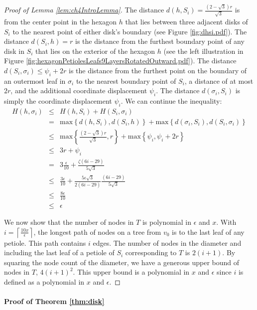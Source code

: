 \documentclass[10pt]{CSUNthesis}
\theoremstyle{plain}%
\theoremstyle{definition}
\theoremstyle{remark}
\newcommand{\ceil}[1]{\left\lceil #1 \right\rceil}
\newcommand{\lr}[1]{\left( #1 \right)}
\begin{document}
\begin{proof}[Proof of Lemma \ref{lem:ch4IntroLemma}]
The distance $d\lr{h,S_i} = \frac{\lr{2-\sqrt{3}}r}{\sqrt{3}}$ is from the center point in the hexagon $h$ that lies between three adjacent disks of $S_i$ to the nearest point of either disk's boundary (see Figure \ref{fig:dhsi.pdf}).  
The distance $d\lr{S_i,h} = r$ is the distance from the furthest boundary point of any disk in $S_i$ that lies on the exterior of the hexagon $h$ (see the left illustration in Figure \ref{fig:hexagonPetiolesLeafs9LayersRotatedOutward.pdf}).  
The distance $d\lr{S_i,\sigma_i} \leq \psi_i + 2r$  is the distance from the furthest point on the boundary of an outermost leaf in $\sigma_i$ to the nearest boundary point of $S_i$, a distance of at most $2r$, and the additional coordinate displacement $\psi_i$.  
The distance $d\lr{\sigma_i,S_i}$ is simply the coordinate displacement $\psi_i$.  
We can continue the inequality:
$$\begin{array}{rcl}
H(h,\sigma_i) &\leq&H(h, S_i) + H(S_i, \sigma_i)\\
&=&\text{max} \left\lbrace d\lr{h,S_i}, d\lr{S_i,h} \right\rbrace + \text{max} \left\lbrace d\lr{\sigma_i,S_i}, d\lr{S_i,\sigma_i} \right\rbrace\\
&\leq& \text{max} \left\lbrace \frac{\lr{2-\sqrt{3}}r}{\sqrt{3}}, r \right\rbrace + \text{max} \left\lbrace \psi_i, \psi_i + 2r\right\rbrace\\
&\leq& 3r + \psi_i \\
&=& 3 \frac{\epsilon}{10} + \frac{\zeta(6i-29)}{5 \sqrt{3}}\\
&\leq&\frac{3\epsilon}{10} + \frac{5\epsilon  \sqrt{3}}{2(6i-29)}\frac{\lr{6i-29}}{5 \sqrt{3}}\\
&\leq&\frac{8\epsilon}{10}\\
&\leq&\epsilon
\end{array}
$$

We now show that the number of nodes in $T$ is polynomial in $\epsilon$ and $x$.  
With $i = \ceil{\frac{10x}{\epsilon}}$, the longest path of nodes on a tree from $v_0$ is to the last leaf of any petiole.  This path contains $i$ edges.  The number of nodes in the diameter and including the last leaf of a petiole of $S_i$ corresponding to $T$ is $2(i+1)$.  By squaring the node count of the diameter, we have a generous upper bound of nodes in $T$, $4(i+1)^2$.  This upper bound is a polynomial in $x$ and $\epsilon$ since $i$ is defined as a polynomial in $x$ and $\epsilon$.

\end{proof}

\paragraph{Proof of Theorem \ref{thm:disk}}
\end{document}
